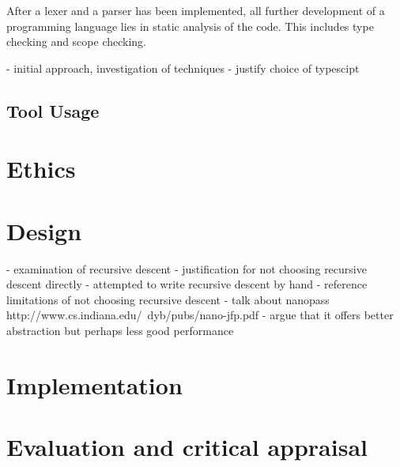 \documentclass{article}
\begin{document}
After a lexer and a parser has been implemented, all further development of a programming language lies in static analysis of the code. This includes type checking and scope checking.






- initial approach, investigation of techniques
- justify choice of typescipt

\subsection{Tool Usage}

\section{Ethics}

\section{Design}
 
- examination of recursive descent 
- justification for not choosing recursive descent directly
    - attempted to write recursive descent by hand
- reference limitations of not choosing recursive descent
- talk about nanopass
 http://www.cs.indiana.edu/~dyb/pubs/nano-jfp.pdf
- argue that it offers better abstraction but perhaps less good performance

\section{Implementation}
 
\section{Evaluation and critical appraisal}
\end{document}
